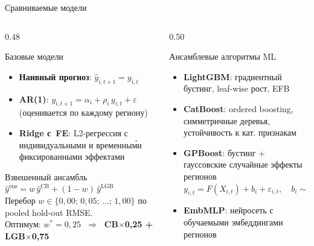\documentclass[aspectratio=169,12pt]{beamer}
\begin{document}
\begin{frame}{Сравниваемые модели}
\begin{columns}[T]
  \begin{column}{0.48\textwidth}
    \begin{block}{Базовые модели}
      \begin{itemize}
        \item \textbf{Наивный прогноз}: $\hat{y}_{i,t+1} = y_{i,t}$
        \item \textbf{AR(1)}: $y_{i,t+1} = \alpha_i + \rho_i\,y_{i,t} + \varepsilon$
              (оценивается по каждому региону)
        \item \textbf{Ridge с~FE}: L2-регрессия с индивидуальными
              и временны\'{м}и фиксированными эффектами
      \end{itemize}
    \end{block}
    \vspace{0.4em}
    \begin{block}{Взвешенный ансамбль}
      $\hat{y}^{\text{ens}} = w\,\hat{y}^{\text{CB}} + (1-w)\,\hat{y}^{\text{LGB}}$\\[4pt]
      Перебор $w\in\{0{,}00;\,0{,}05;\,\ldots;\,1{,}00\}$ по pooled hold-out RMSE.\\[4pt]
      Оптимум: $w^* = 0{,}25$
      $\;\Rightarrow\;$ \textbf{CB$\times$0,25 + LGB$\times$0,75}
    \end{block}
  \end{column}
  \begin{column}{0.50\textwidth}
    \begin{block}{Ансамблевые алгоритмы ML}
      \begin{itemize}
        \item \textbf{LightGBM}: градиентный бустинг, leaf-wise рост, EFB
        \item \textbf{CatBoost}: ordered boosting, симметричные деревья,
              устойчивость к кат. признакам
        \item \textbf{GPBoost}: бустинг + гауссовские случайные эффекты
              регионов\\[-2pt]
              {\small$y_{i,t} = F(X_{i,t}) + b_i + \varepsilon_{i,t},\quad
               b_i\sim\mathcal{N}(0,\sigma_b^2)$}
        \item \textbf{EmbMLP}: нейросеть с обучаемыми эмбеддингами регионов
      \end{itemize}
    \end{block}
  \end{column}
\end{columns}
\end{frame}
\end{document}
